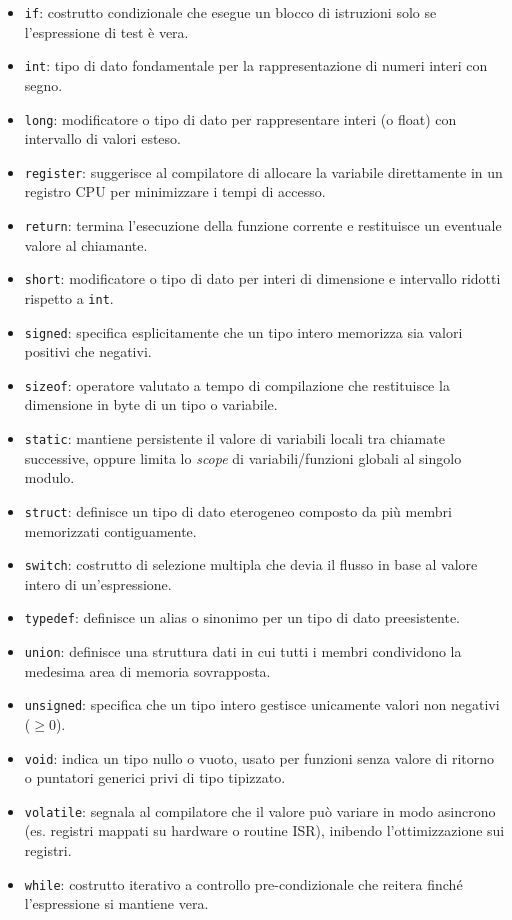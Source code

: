 \begin{itemize}
	\item \texttt{if}: costrutto condizionale che esegue un blocco di istruzioni solo se l'espressione di test è vera.
	\item \texttt{int}: tipo di dato fondamentale per la rappresentazione di numeri interi con segno.
	\item \texttt{long}: modificatore o tipo di dato per rappresentare interi (o float) con intervallo di valori esteso.
	\item \texttt{register}: suggerisce al compilatore di allocare la variabile direttamente in un registro CPU per minimizzare i tempi di accesso.
	\item \texttt{return}: termina l'esecuzione della funzione corrente e restituisce un eventuale valore al chiamante.
	\item \texttt{short}: modificatore o tipo di dato per interi di dimensione e intervallo ridotti rispetto a \texttt{int}.
	\item \texttt{signed}: specifica esplicitamente che un tipo intero memorizza sia valori positivi che negativi.
	\item \texttt{sizeof}: operatore valutato a tempo di compilazione che restituisce la dimensione in byte di un tipo o variabile.
	\item \texttt{static}: mantiene persistente il valore di variabili locali tra chiamate successive, oppure limita lo \textit{scope} di variabili/funzioni globali al singolo modulo.
	\item \texttt{struct}: definisce un tipo di dato eterogeneo composto da più membri memorizzati contiguamente.
	\item \texttt{switch}: costrutto di selezione multipla che devia il flusso in base al valore intero di un'espressione.
	\item \texttt{typedef}: definisce un alias o sinonimo per un tipo di dato preesistente.
	\item \texttt{union}: definisce una struttura dati in cui tutti i membri condividono la medesima area di memoria sovrapposta.
	\item \texttt{unsigned}: specifica che un tipo intero gestisce unicamente valori non negativi ($\ge 0$).
	\item \texttt{void}: indica un tipo nullo o vuoto, usato per funzioni senza valore di ritorno o puntatori generici privi di tipo tipizzato.
	\item \texttt{volatile}: segnala al compilatore che il valore può variare in modo asincrono (es. registri mappati su hardware o routine ISR), inibendo l'ottimizzazione sui registri.
	\item \texttt{while}: costrutto iterativo a controllo pre-condizionale che reitera finché l'espressione si mantiene vera.
\end{itemize}

